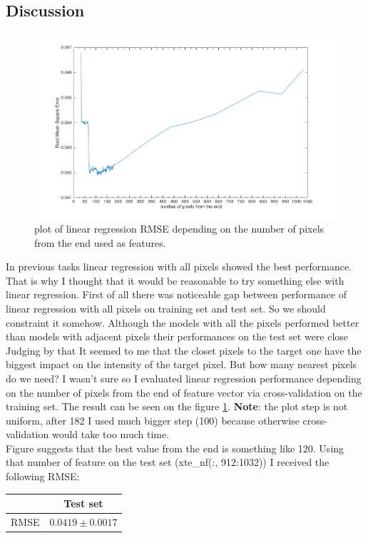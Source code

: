 \documentclass{article}
\begin{document}
		\subsection{Discussion}
		 	\begin{figure}[htbp]
		 		\centering
		 		\includegraphics[width=16cm]{images/p1-6_num_pixels.png}
		 		\caption{plot of linear regression RMSE depending on the number of pixels from the end  used as features.}
		 		\label{fig:p1-6_num_pixels}
		 	\end{figure}
		 	In previous tasks linear regression with all pixels showed the best performance. That is why I thought that it would be reasonable to try something else with linear regression. First of all there was noticeable gap between performance of linear regression with all pixels on training set and test set. So we should constraint it somehow. Although the models with all the pixels performed better than models with adjacent pixels their performances on the test set were close Judging by that It seemed to me that the closet pixels to the target one have the biggest impact on the intensity of the target pixel.  But how many nearest pixels do we need? I wasn't sure so I evaluated linear regression performance depending on the number of pixels from the end of feature vector via cross-validation on the training set. The result can be seen on the figure \ref{fig:p1-6_num_pixels}. \textbf{Note}: the plot step is not uniform, after 182 I used much bigger step (100) because otherwise cross-validation would take too much time.\\ Figure suggests that the best value from the end is something like 120. Using that number of feature on the test set (xte\_nf(:, 912:1032)) I received the following RMSE:
			\begin{center}
				\begin{tabular}{| c | c | }
					\hline
					\, &  Test set \\ \hline
					RMSE & $0.0419 \pm 0.0017$ \\ 
					\hline
				\end{tabular}
			\end{center}
			
\end{document}
